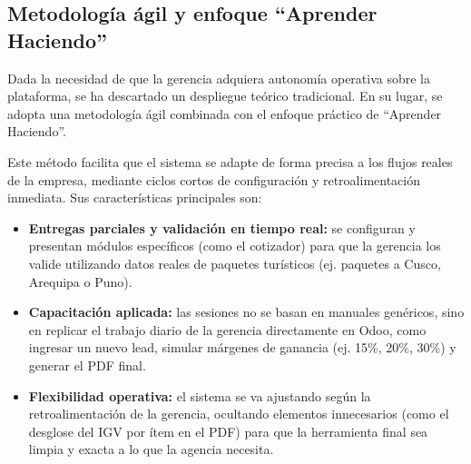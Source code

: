 \subsection{Metodología ágil y enfoque ``Aprender Haciendo''}
\begin{indentedsubsection}
Dada la necesidad de que la gerencia adquiera autonomía operativa sobre la plataforma, se ha descartado un despliegue teórico tradicional. En su lugar, se adopta una metodología ágil combinada con el enfoque práctico de ``Aprender Haciendo''.

Este método facilita que el sistema se adapte de forma precisa a los flujos reales de la empresa, mediante ciclos cortos de configuración y retroalimentación inmediata. Sus características principales son:

\begin{itemize}
    \item \textbf{Entregas parciales y validación en tiempo real:} se configuran y presentan módulos específicos (como el cotizador) para que la gerencia los valide utilizando datos reales de paquetes turísticos (ej. paquetes a Cusco, Arequipa o Puno).
    \item \textbf{Capacitación aplicada:} las sesiones no se basan en manuales genéricos, sino en replicar el trabajo diario de la gerencia directamente en Odoo, como ingresar un nuevo lead, simular márgenes de ganancia (ej. 15\%, 20\%, 30\%) y generar el PDF final.
    \item \textbf{Flexibilidad operativa:} el sistema se va ajustando según la retroalimentación de la gerencia, ocultando elementos innecesarios (como el desglose del IGV por ítem en el PDF) para que la herramienta final sea limpia y exacta a lo que la agencia necesita.
\end{itemize}
\end{indentedsubsection}

